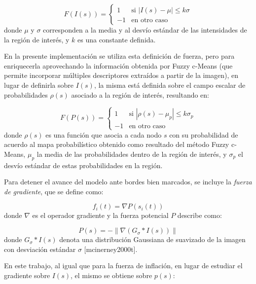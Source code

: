 %
\begin{equation}
F(I(s)) = \begin{cases} 1 & \text{si } \left|I(s) - \mu \right| \leq k\sigma \\ -1 & \text{en otro caso} \end{cases}
\end{equation}
%
donde $\mu$ y $\sigma$ corresponden a la media y al desvío estándar de las intensidades de la región de interés, y $k$ es una constante definida.

En la presente implementación se utiliza esta definición de fuerza, pero para enriquecerla aprovechando la información obtenida por Fuzzy c-Means (que permite incorporar múltiples descriptores extraídos a partir de la imagen), en lugar de definirla sobre $I(s)$, la misma está definida sobre el campo escalar de probabilidades $\rho(s)$ asociado a la región de interés, resultando en:

%
\begin{equation}
F(P(s)) = \begin{cases} 1 & \text{si } \left|\rho(s) - \mu_{p} \right| \leq k\sigma_{p} \\ -1 & \text{en otro caso} \end{cases}
\end{equation}
%
donde $\rho(s)$ es una función que asocia a cada nodo $s$ con su probabilidad de acuerdo al mapa probabilístico obtenido como resultado del método Fuzzy c-Means, $\mu_{p}$ la media de las probabilidades dentro de la región de interés, y $\sigma_{p}$ el desvío estándar de estas probabilidades en la región.

Para detener el avance del modelo ante bordes bien marcados, se incluye la \emph{fuerza de gradiente}, que se define como:

%
\begin{equation}
f_{i}(t) = \nabla P(s_{i}(t))
\end{equation}
%
donde $\nabla$ es el operador gradiente y la fuerza potencial $P$ describe como:

%
\begin{equation}
P(s) = - \left\| \nabla(G_{\sigma} * I(s)) \right\| 
\label{eq:zz}
\end{equation}
%
donde $G_{\sigma} * I(s)$ denota una distribución Gaussiana de suavizado de la imagen con desviación estándar $\sigma$ [mcinerney2000t].

En este trabajo, al igual que para la fuerza de inflación, en lugar de estudiar el gradiente sobre $I(s)$, el mismo se obtiene sobre $p(s)$:

